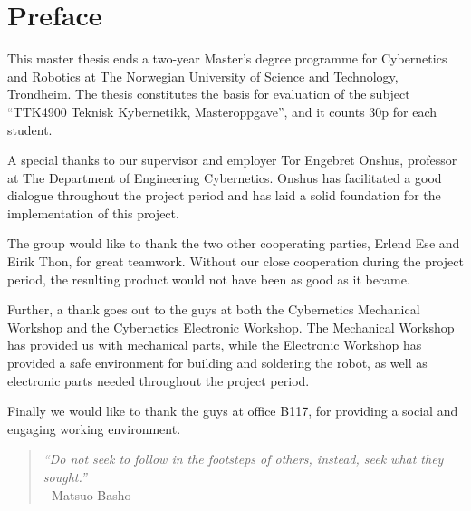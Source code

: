 \chapter*{Preface}
This master thesis ends a two-year Master's degree programme for Cybernetics and Robotics at The Norwegian University of Science and Technology, Trondheim. The thesis constitutes the basis for evaluation of the subject ``TTK4900 Teknisk Kybernetikk, Masteroppgave'', and it counts 30p for each student.

A special thanks to our supervisor and employer Tor Engebret Onshus, professor at The Department of Engineering Cybernetics. Onshus has facilitated a good dialogue throughout the project period and has laid a solid foundation for the implementation of this project.

The group would like to thank the two other cooperating parties, Erlend Ese and Eirik Thon, for great teamwork. Without our close cooperation during the project period, the resulting product would not have been as good as it became.

Further, a thank goes out to the guys at both the Cybernetics Mechanical Workshop and the Cybernetics Electronic Workshop. The Mechanical Workshop has provided us with mechanical parts, while the Electronic Workshop has provided a safe environment for building and soldering the robot, as well as electronic parts needed throughout the project period.

Finally we would like to thank the guys at office B117, for providing a social and engaging working environment.
\\[5mm]

\begin{quotation}
\color{darkred}
 \textit{``Do not seek to follow in the footsteps of others, instead, seek what they sought.''} \\
 - Matsuo Basho
\end{quotation}

